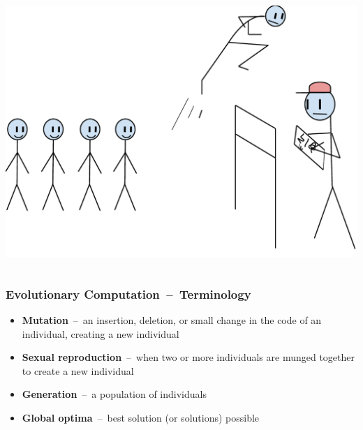 \documentclass{beamer}
\newcommand{\linespace}{\vskip 0.25cm}
\begin{document}
\begin{frame}
\begin{columns}
\begin{column}{0.3\textwidth}
			\linespace
			\pause[4]
			\includegraphics[height=.7\textwidth]{Illustrations/fitness_test.PDF}
		\end{column}
		\end{columns}
\end{frame}

\begin{frame}
	\frametitle{Evolutionary Computation~--~Terminology}
	\begin{itemize}
		\item \textbf{Mutation}~--~an insertion, deletion, or small change in the code of an individual, creating a new individual
		\linespace
		\pause
		\item \textbf{Sexual reproduction}~--~when two or more individuals are munged together to create a new individual
		\linespace
		\pause
		\item \textbf{Generation}~--~a population of individuals
		\pause
		\linespace
		\item \textbf{Global optima}~--~best solution (or solutions) possible
	\end{itemize}
\end{frame}
\end{document}
